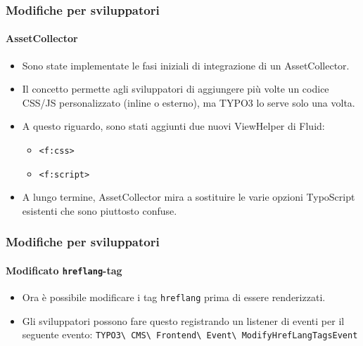 
\begin{frame}[fragile]
	\frametitle{Modifiche per sviluppatori}
	\framesubtitle{AssetCollector}

	\begin{itemize}
		\item Sono state implementate le fasi iniziali di integrazione di un AssetCollector.
		\item Il concetto permette agli sviluppatori di aggiungere più volte un codice CSS/JS personalizzato (inline o esterno),
			ma TYPO3 lo serve solo una volta.
		\item A questo riguardo, sono stati aggiunti due nuovi ViewHelper di Fluid:
			\begin{itemize}
				\item \texttt{<f:css>}
				\item \texttt{<f:script>}
			\end{itemize}
		\item A lungo termine, AssetCollector mira a sostituire le varie opzioni TypoScript
			esistenti che sono piuttosto confuse.
	\end{itemize}

\end{frame}


\begin{frame}[fragile]
	\frametitle{Modifiche per sviluppatori}
	\framesubtitle{Modificato \texttt{hreflang}-tag}

	\lstset{basicstyle=\smaller\ttfamily}

	\begin{itemize}
		\item Ora è possibile modificare i tag \texttt{hreflang} prima di essere renderizzati.
		\item Gli sviluppatori possono fare questo registrando un listener di eventi per il seguente evento:\newline
			\smaller
				\texttt{TYPO3\textbackslash
					CMS\textbackslash
					Frontend\textbackslash
					Event\textbackslash
					ModifyHrefLangTagsEvent}
			\normalsize
	\end{itemize}

\end{frame}


